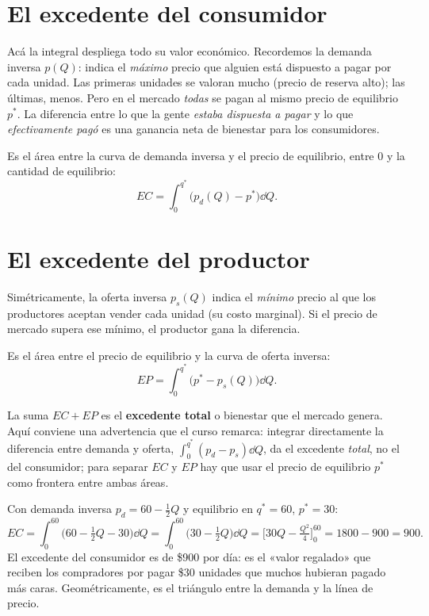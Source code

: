 \section{El excedente del consumidor}

Acá la integral despliega todo su valor económico. Recordemos la demanda inversa $p(Q)$: indica el \emph{máximo} precio que alguien está dispuesto a pagar por cada unidad. Las primeras unidades se valoran mucho (precio de reserva alto); las últimas, menos. Pero en el mercado \emph{todas} se pagan al mismo precio de equilibrio $p^{*}$. La diferencia entre lo que la gente \emph{estaba dispuesta a pagar} y lo que \emph{efectivamente pagó} es una ganancia neta de bienestar para los consumidores.

\begin{definicion}
Es el área entre la curva de demanda inversa y el precio de equilibrio, entre $0$ y la cantidad de equilibrio:
\[
EC = \int_0^{q^{*}} \big(p_d(Q) - p^{*}\big)\dd Q .
\]
\end{definicion}

\section{El excedente del productor}

Simétricamente, la oferta inversa $p_s(Q)$ indica el \emph{mínimo} precio al que los productores aceptan vender cada unidad (su costo marginal). Si el precio de mercado supera ese mínimo, el productor gana la diferencia.

\begin{definicion}
Es el área entre el precio de equilibrio y la curva de oferta inversa:
\[
EP = \int_0^{q^{*}} \big(p^{*} - p_s(Q)\big)\dd Q .
\]
\end{definicion}

La suma $EC + EP$ es el \textbf{excedente total} o bienestar que el mercado genera. Aquí conviene una advertencia que el curso remarca: integrar directamente la diferencia entre demanda y oferta, $\int_0^{q^{*}}(p_d - p_s)\dd Q$, da el excedente \emph{total}, no el del consumidor; para separar $EC$ y $EP$ hay que usar el precio de equilibrio $p^{*}$ como frontera entre ambas áreas.

\begin{ejemplo}
Con demanda inversa $p_d = 60 - \tfrac12 Q$ y equilibrio en $q^{*}=60$, $p^{*}=30$:
\[
EC = \int_0^{60}\Big(60 - \tfrac12 Q - 30\Big)\dd Q
= \int_0^{60}\Big(30 - \tfrac12 Q\Big)\dd Q
= \Big[30Q - \tfrac{Q^2}{4}\Big]_0^{60} = 1800 - 900 = 900.
\]
El excedente del consumidor es de \$900 por día: es el «valor regalado» que reciben los compradores por pagar \$30 unidades que muchos hubieran pagado más caras. Geométricamente, es el triángulo entre la demanda y la línea de precio.
\end{ejemplo}

